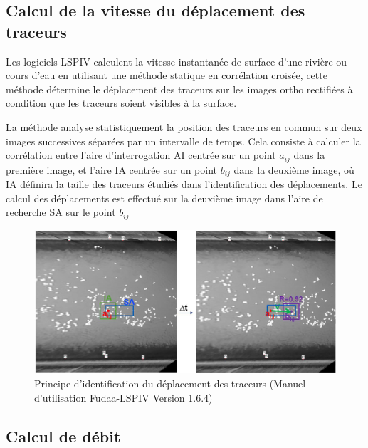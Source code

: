 \documentclass[
]{article}
\begin{document}
\hypertarget{calcul-de-la-vitesse-du-duxe9placement-des-traceurs}{%
\subsection{Calcul de la vitesse du déplacement des traceurs}\label{calcul-de-la-vitesse-du-duxe9placement-des-traceurs}}

Les logiciels LSPIV calculent la vitesse instantanée de surface d'une rivière ou cours d'eau en utilisant une méthode statique en corrélation croisée, cette méthode détermine le déplacement des traceurs sur les images ortho rectifiées à condition que les traceurs soient visibles à la surface.

La méthode analyse statistiquement la position des traceurs en commun sur deux images successives séparées par un intervalle de temps. Cela consiste à calculer la corrélation entre l'aire d'interrogation \(\text{AI}\) centrée sur un point \(a_{ij}\) dans la première image, et l'aire \(\text{IA}\) centrée sur un point \(b_{ij}\) dans la deuxième image, où \(\text{IA}\) définira la taille des traceurs étudiés dans l'identification des déplacements. Le calcul des déplacements est effectué sur la deuxième image dans l'aire de recherche \(\text{SA}\) sur le point \(b_{ij}\)



\begin{figure}[H]
\includegraphics[width=1\linewidth,]{images/calculationdevitesse} \caption{Principe d'identification du déplacement des traceurs (Manuel d'utilisation Fudaa-LSPIV Version 1.6.4)}\label{fig:unnamed-chunk-4}
\end{figure}

\hypertarget{calcul-de-duxe9bit}{%
\subsection{Calcul de débit}\label{calcul-de-duxe9bit}}
\end{document}
